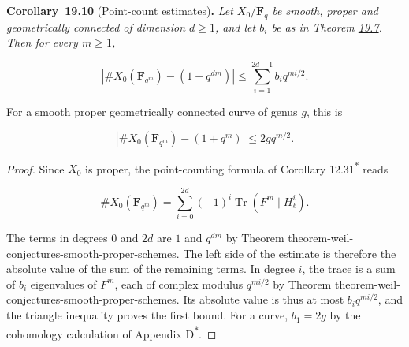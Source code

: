 \documentclass[11pt]{article}
\newenvironment{bpstatement}[2]{\par\addvspace{0.6\baselineskip}\noindent\textbf{#1}#2\textbf{.}\enspace\ignorespaces}
  {\par\addvspace{0.4\baselineskip}}
\newenvironment{bpstatementit}[2]{\begin{bpstatement}{#1}{#2}\itshape\ignorespaces}{\end{bpstatement}}
\newcommand{\bpout}[1]{#1\textsuperscript{\hyperlink{bp-outside}{\ensuremath{\ast}}}}
\begin{document}
\label{bp348}%
\begin{bpstatementit}{Corollary~19.10}{ (Point-count estimates)}
Let \(X_0/\mathbf F_q\) be smooth, proper and geometrically connected of dimension \(d\geq1\), and let \(b_i\) be as in Theorem \hyperref[bp342]{19.7}. Then for every \(m\geq1\),

\[
\left|\#X_0(\mathbf F_{q^m})-(1+q^{dm})\right|
\leq\sum_{i=1}^{2d-1}b_iq^{mi/2}.
\]

For a smooth proper geometrically connected curve of genus \(g\), this is

\[
\left|\#X_0(\mathbf F_{q^m})-(1+q^m)\right|
\leq 2gq^{m/2}.
\]
\end{bpstatementit}

\begin{proof}[{Proof}]\label{bp349}%
Since \(X_0\) is proper, the point-counting formula of Corollary \bpout{12.31} reads

\[
\#X_0(\mathbf F_{q^m})
=\sum_{i=0}^{2d}(-1)^i\operatorname{Tr}(F^m\mid H^i_\ell).
\]

The terms in degrees \(0\) and \(2d\) are \(1\) and \(q^{dm}\) by Theorem theorem-weil-conjectures-smooth-proper-schemes. The left side of the estimate is therefore the absolute value of the sum of the remaining terms. In degree \(i\), the trace is a sum of \(b_i\) eigenvalues of \(F^m\), each of complex modulus \(q^{mi/2}\) by Theorem theorem-weil-conjectures-smooth-proper-schemes. Its absolute value is thus at most \(b_iq^{mi/2}\), and the triangle inequality proves the first bound. For a curve, \(b_1=2g\) by the cohomology calculation of Appendix \bpout{D}.
\end{proof}




\clearpage{}\hypertarget{bp-outside}{}%
\end{document}
